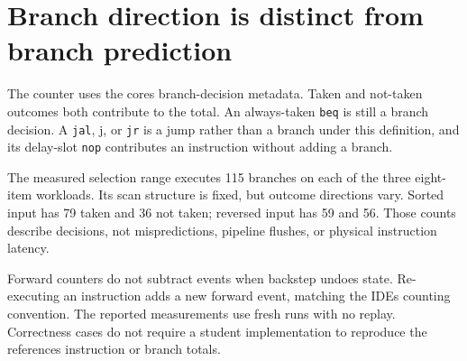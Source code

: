 \section{Branch direction is distinct from branch
  prediction}\label{009-sorting-visualizer-p11-branch-direction-is-distinct-from-branch-prediction}

The counter uses the core\textquotesingle s branch-decision metadata.
Taken and not-taken outcomes both contribute to the total. An
always-taken \texttt{beq} is still a branch decision. A \texttt{jal}, j,
or \texttt{jr} is a jump rather than a branch under this definition, and
its delay-slot \texttt{nop} contributes an instruction without adding a
branch.

The measured selection range executes 115 branches on each of the three
eight-item workloads. Its scan structure is fixed, but outcome
directions vary. Sorted input has 79 taken and 36 not taken; reversed
input has 59 and 56. Those counts describe decisions, not
mispredictions, pipeline flushes, or physical instruction latency.

Forward counters do not subtract events when backstep undoes state.
Re-executing an instruction adds a new forward event, matching the
IDE\textquotesingle s counting convention. The reported measurements use
fresh runs with no replay. Correctness cases do not require a student
implementation to reproduce the reference\textquotesingle s instruction
or branch totals.
